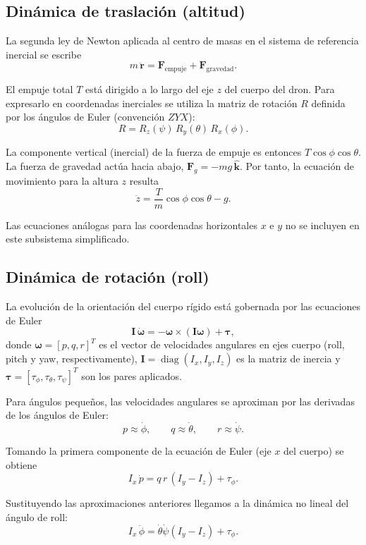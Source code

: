 \documentclass{uofa-eng-assignment}
\begin{document}
\subsection{Dinámica de traslación (altitud)}

La segunda ley de Newton aplicada al centro de masas en el sistema de referencia inercial se escribe
\[
m\,\ddot{\mathbf{r}} = \mathbf{F}_{\text{empuje}} + \mathbf{F}_{\text{gravedad}}.
\]

El empuje total $T$ está dirigido a lo largo del eje $z$ del cuerpo del dron. Para expresarlo en coordenadas inerciales se utiliza la matriz de rotación $R$ definida por los ángulos de Euler (convención $ZYX$):
\[
R = R_z(\psi)\,R_y(\theta)\,R_x(\phi).
\]

La componente vertical (inercial) de la fuerza de empuje es entonces $T\cos\phi\cos\theta$. La fuerza de gravedad actúa hacia abajo, $\mathbf{F}_g = -mg\,\hat{\mathbf{k}}$. Por tanto, la ecuación de movimiento para la altura $z$ resulta
\begin{equation}
\boxed{\ddot{z} = \frac{T}{m}\cos\phi\cos\theta - g}. \label{eq:z}
\end{equation}

Las ecuaciones análogas para las coordenadas horizontales $x$ e $y$ no se incluyen en este subsistema simplificado.

\subsection{Dinámica de rotación (roll)}

La evolución de la orientación del cuerpo rígido está gobernada por las ecuaciones de Euler
\[
\mathbf{I}\,\dot{\boldsymbol{\omega}} = -\boldsymbol{\omega}\times(\mathbf{I}\boldsymbol{\omega}) + \boldsymbol{\tau},
\]
donde $\boldsymbol{\omega}=[p,q,r]^T$ es el vector de velocidades angulares en ejes cuerpo (roll, pitch y yaw, respectivamente), $\mathbf{I}=\operatorname{diag}(I_x,I_y,I_z)$ es la matriz de inercia y $\boldsymbol{\tau}=[\tau_\phi,\tau_\theta,\tau_\psi]^T$ son los pares aplicados.

Para ángulos pequeños, las velocidades angulares se aproximan por las derivadas de los ángulos de Euler:
\[
p \approx \dot{\phi},\qquad q \approx \dot{\theta},\qquad r \approx \dot{\psi}.
\]

Tomando la primera componente de la ecuación de Euler (eje $x$ del cuerpo) se obtiene
\[
I_x\,\dot{p} = q\,r\,(I_y - I_z) + \tau_\phi.
\]

Sustituyendo las aproximaciones anteriores llegamos a la dinámica no lineal del ángulo de roll:
\begin{equation}
\boxed{I_x\,\ddot{\phi} = \dot{\theta}\dot{\psi}(I_y - I_z) + \tau_\phi}. \label{eq:phi}
\end{equation}
\end{document}
